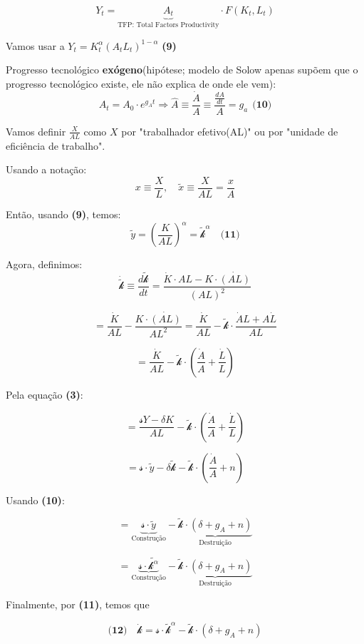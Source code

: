 \documentclass[a4paper,12pt]{article}[abntex2]
\begin{document}
\[
Y_t=\underbrace{A_t}_\text{TFP: Total Factors Productivity}\cdot F(K_t,L_t)
\]

Vamos usar a \(Y_t=K_t^{\alpha}(A_tL_t)^{1-\alpha}\) \textbf{(9)}

Progresso tecnológico \textbf{exógeno}(hipótese; modelo de Solow apenas supõem que o progresso tecnológico existe, ele não explica de onde ele vem):
\[
A_t=A_0\cdot e^{g_At} \Rightarrow \hat{A}\equiv\frac{\dot{A}}{A}\equiv \frac{\frac{dA}{dt}}{A}=g_a \ \ \textbf{(10)}
\]

Vamos definir \( \frac{X}{AL} \) como \( X \) por "trabalhador efetivo(AL)" ou por "unidade de eficiência de trabalho".

Usando a notação:
\[
x \equiv \frac{X}{L}, \quad \tilde{x} \equiv \frac{X}{AL} = \frac{x}{A}
\]

Então, usando \textbf{(9)}, temos:
\[
\tilde{y} = \left( \frac{K}{AL} \right)^{\alpha} = \tilde{\mathcal{k}}^{\alpha} \quad \textbf{(11)}
\]

Agora, definimos:
\[
\dot{\tilde{\mathcal{k}}} \equiv \frac{d\tilde{\mathcal{k}}}{dt} = \frac{\dot{K} \cdot AL - K \cdot \dot{(AL)}}{(AL)^2}
\]

\[
= \frac{\dot{K}}{AL} - \frac{K \cdot \dot{(AL)}}{AL^2} = \frac{\dot{K}}{AL} - \tilde{\mathcal{k}} \cdot \frac{\dot{A}L + A\dot{L}}{AL}
\]

\[
= \frac{\dot{K}}{AL} - \tilde{\mathcal{k}} \cdot \left( \frac{\dot{A}}{A} + \frac{\dot{L}}{L} \right)
\]

Pela equação \textbf{(3)}:

\[
= \frac{\mathcal{s}Y - \delta K}{AL} - \tilde{\mathcal{k}} \cdot \left( \frac{\dot{A}}{A} + \frac{\dot{L}}{L} \right)
\]

\[
= \mathcal{s} \cdot \tilde{y} - \delta \tilde{\mathcal{k}} - \tilde{\mathcal{k}} \cdot \left( \frac{\dot{A}}{A} + n \right)
\]

Usando \textbf{(10)}:

\[
= \underbrace{\mathcal{s} \cdot \tilde{y}}_\text{Construção} - \underbrace{\tilde{\mathcal{k}} \cdot (\delta + g_A + n)}_\text{Destruição}
\]

\[
= \underbrace{\mathcal{s} \cdot \tilde{\mathcal{k^\alpha}}}_\text{Construção} - \underbrace{\tilde{\mathcal{k}} \cdot (\delta + g_A + n)}_\text{Destruição}
\]

Finalmente, por \textbf{(11)}, temos que

\[
\textbf{(12)} \quad \dot{\mathcal{k}} = \mathcal{s} \cdot \tilde{\mathcal{k}}^{\alpha} - \tilde{\mathcal{k}} \cdot (\delta + g_A + n)
\]
\end{document}
